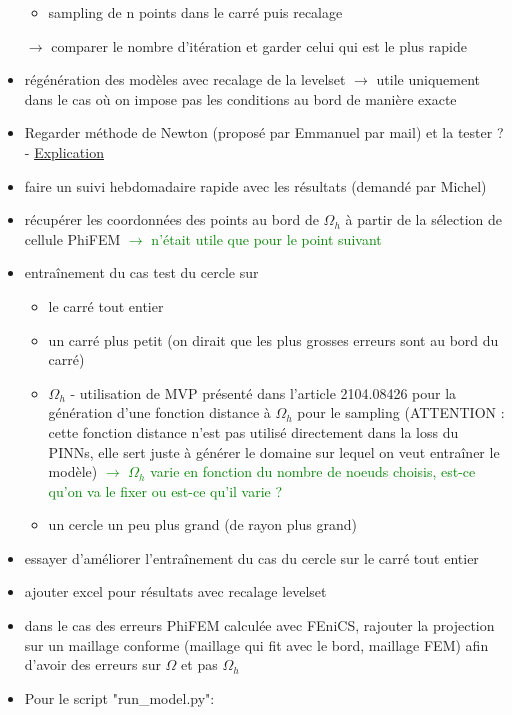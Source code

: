 \begin{itemize}[label=$\square$]
\begin{itemize}[label=\LARGE $\circ$]
		\item sampling de n points dans le carré puis recalage
	\end{itemize}
	$\rightarrow$ comparer le nombre d'itération et garder celui qui est le plus rapide
	\item régénération des modèles avec recalage de la levelset $\rightarrow$ utile uniquement dans le cas où on impose pas les conditions au bord de manière exacte
	\item Regarder méthode de Newton (proposé par Emmanuel par mail) et la tester ? - \href{https://www.mathweb.fr/euclide/methode-de-newton/}{Explication}
	\item[\done] faire un suivi hebdomadaire rapide avec les résultats (demandé par Michel)
	\item[\wontfix] récupérer les coordonnées des points au bord de $\Omega_h$ à partir de la sélection de cellule PhiFEM \textcolor{Green}{$\rightarrow$ n'était utile que pour le point suivant}
	\item entraînement du cas test du cercle sur 
	\begin{itemize}[label=\LARGE $\circ$]
		\item[\done] le carré tout entier
		\item un carré plus petit (on dirait que les plus grosses erreurs sont au bord du carré)
		\item[\swontfix] $\Omega_h$ - utilisation de MVP présenté dans l'article 2104.08426 pour la génération d'une fonction distance à $\Omega_h$ pour le sampling (ATTENTION : cette fonction distance n'est pas utilisé directement dans la loss du PINNs, elle sert juste à générer le domaine sur lequel on veut entraîner le modèle) \textcolor{Green}{$\rightarrow$ $\Omega_h$ varie en fonction du nombre de noeuds choisis, est-ce qu'on va le fixer ou est-ce qu'il varie ?}
		\item un cercle un peu plus grand (de rayon plus grand) 
	\end{itemize}
	\item essayer d'améliorer l'entraînement du cas du cercle sur le carré tout entier
	\item ajouter excel pour résultats avec recalage levelset
	\item dans le cas des erreurs PhiFEM calculée avec FEniCS, rajouter la projection sur un maillage conforme (maillage qui fit avec le bord, maillage FEM) afin d'avoir des erreurs sur $\Omega$ et pas $\Omega_h$
	\item Pour le script "run\_model.py":
	\begin{itemize}[label=\LARGE $\circ$]

\end{itemize}
\end{itemize}
